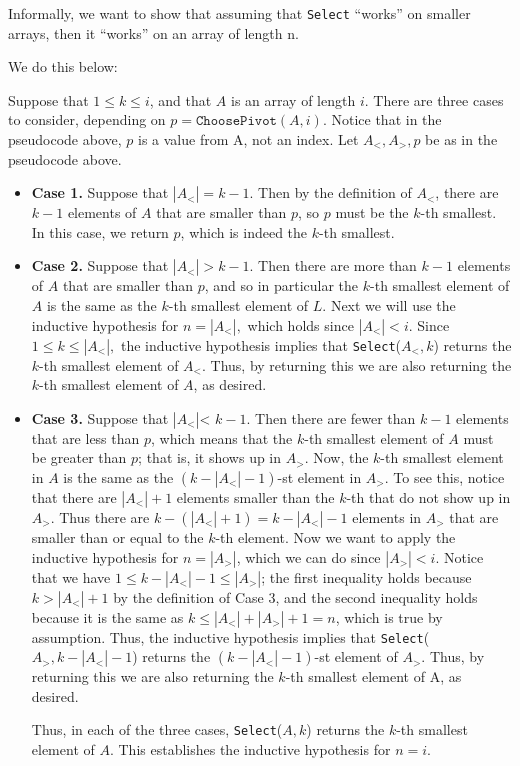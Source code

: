 \documentclass [12pt]{article}
\begin{document}
Informally, we want to show that assuming that \texttt{Select} ``works'' on smaller arrays, then it ``works'' on an array of length n. 

We do this below:

Suppose that $1 \leq k \leq i$, and that $A$ is an array of length $i$. There are three cases to consider,
depending on $p = \texttt{ChoosePivot}(A, i)$. Notice that in the pseudocode above, $p$ is a value from A, not an index. Let $A_<, A_>, p$ be as in the pseudocode above.

\begin{itemize}
\item \textbf{Case 1.} Suppose that $|A_<| = k -1$. Then by the definition of $A_<$, there are $k -1$ elements of $A$ that are smaller than $p$, so $p$ must be the $k$-th smallest. In this case, we return $p$, which is indeed the $k$-th smallest.
\item \textbf{Case 2.} Suppose that $|A_<| > k -1$. Then there are more than $k -1$ elements of $A$ that are smaller than $p$, and so in particular the $k$-th smallest element of $A$ is the same as the $k$-th smallest element of $L$. Next we will use the inductive hypothesis for $n = |A_<|,$ which holds since $|A_<| < i$. Since $1 \leq k \leq |A_<|,$ the inductive hypothesis implies that \texttt{Select}($A_<, k$) returns the $k$-th smallest element of $A_<$. Thus, by returning this we are also returning the $k$-th smallest element of $A$, as desired.
\item \textbf{Case 3.} Suppose that $|A_<| $< $k -1$. Then there are fewer than $k -1$ elements that are less than $p$, which means that the $k$-th smallest element of $A$ must be greater than $p$; that is, it shows up in $A_>$. Now, the $k$-th smallest element in $A$ is the same as the $(k -|A_<| -1)$-st element in $A_>$. To see this, notice that there are $|A_<| + 1$ elements smaller than the $k$-th that do not show up in $A_>$. Thus there are $k -(|A_<| + 1) = k -|A_<| -1$ elements in $A_>$ that are smaller than or equal to the $k$-th element. Now we want to apply the inductive hypothesis for $n = |A_>|$, which we can do since $|A_>| < i$. Notice that we have $1 \leq k -|A_<| -1 \leq |A_>|$; the first inequality holds because $k > |A_<| + 1$ by the definition of Case 3, and the second inequality holds because it is the same as $k \leq |A_<| + |A_>| + 1 = n$, which is true by assumption. Thus, the inductive hypothesis implies that \texttt{Select}($A_>, k -|A_<| -1$) returns the $(k -|A_<| -1)$-st element of $A_>$. Thus, by returning this we are also returning the $k$-th smallest element of A, as desired.

Thus, in each of the three cases, \texttt{Select}($A, k$) returns the $k$-th smallest element of $A$. This establishes the inductive hypothesis for $n = i$.
\end{itemize}
\end{document}
